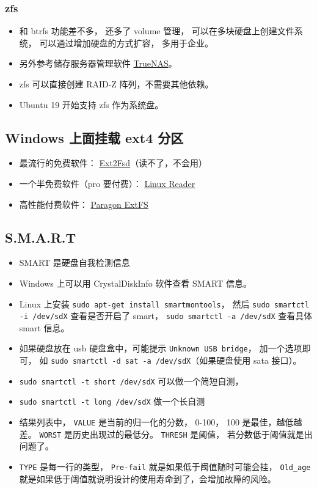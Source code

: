 \subsubsection{zfs}
\begin{itemize}
\item 和 btrfs 功能差不多， 还多了 volume 管理， 可以在多块硬盘上创建文件系统， 可以通过增加硬盘的方式扩容， 多用于企业。
\item 另外参考储存服务器管理软件 \href{https://www.truenas.com/truenas-core/}{TrueNAS}。
\item zfs 可以直接创建 RAID-Z 阵列，不需要其他依赖。
\item Ubuntu 19 开始支持 zfs 作为系统盘。
\end{itemize}


\subsection{Windows 上面挂载 ext4 分区}
\begin{itemize}
\item 最流行的免费软件： \href{https://sourceforge.net/projects/ext2fsd/}{Ext2Fsd}（读不了，不会用）
\item 一个半免费软件（pro 要付费）： \href{https://www.diskinternals.com/linux-reader/}{Linux Reader}
\item 高性能付费软件： \href{https://www.paragon-software.com/business/extfs-for-windows/}{Paragon ExtFS}
\end{itemize}

\subsection{S.M.A.R.T}
\begin{itemize}
\item SMART 是硬盘自我检测信息
\item Windows 上可以用 CrystalDiskInfo 软件查看 SMART 信息。
\item Linux 上安装 \verb`sudo apt-get install smartmontools`， 然后 \verb`sudo smartctl -i /dev/sdX` 查看是否开启了 smart， \verb`sudo smartctl -a /dev/sdX` 查看具体 smart 信息。
\item 如果硬盘放在 usb 硬盘盒中，可能提示 \verb`Unknown USB bridge`， 加一个选项即可， 如 \verb`sudo smartctl -d sat -a /dev/sdX`（如果硬盘使用 sata 接口）。
\item \verb`sudo smartctl -t short /dev/sdX` 可以做一个简短自测，
\item \verb`sudo smartctl -t long /dev/sdX` 做一个长自测
\item 结果列表中， \verb`VALUE` 是当前的归一化的分数， 0-100， 100 是最佳，越低越差。 \verb`WORST` 是历史出现过的最低分。 \verb`THRESH` 是阈值， 若分数低于阈值就是出问题了。
\item \verb`TYPE` 是每一行的类型， \verb`Pre-fail` 就是如果低于阈值随时可能会挂， \verb`Old_age` 就是如果低于阈值就说明设计的使用寿命到了，会增加故障的风险。
\end{itemize}


